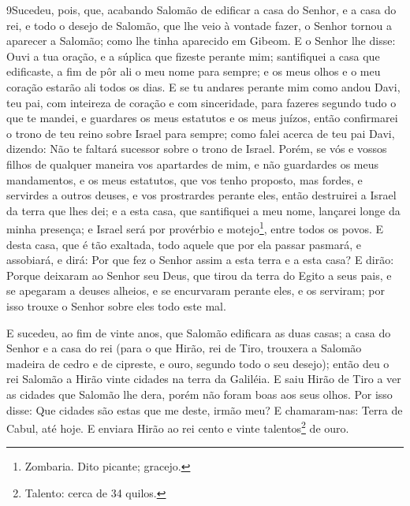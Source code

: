 \lettrine{9} Sucedeu, pois, que, acabando Salomão de edificar
a casa do Senhor, e a casa do rei, e todo o desejo de Salomão, que
lhe veio à vontade fazer, o Senhor tornou a aparecer a Salomão;
como lhe tinha aparecido em Gibeom. E o Senhor lhe disse: Ouvi a
tua oração, e a súplica que fizeste perante mim; santifiquei a casa
que edificaste, a fim de pôr ali o meu nome para sempre; e os meus
olhos e o meu coração estarão ali todos os dias. E se tu andares
perante mim como andou Davi, teu pai, com inteireza de coração e com
sinceridade, para fazeres segundo tudo o que te mandei, e guardares
os meus estatutos e os meus juízos, então confirmarei o trono de
teu reino sobre Israel para sempre; como falei acerca de teu pai
Davi, dizendo: Não te faltará sucessor sobre o trono de Israel.
Porém, se vós e vossos filhos de qualquer maneira vos apartardes
de mim, e não guardardes os meus mandamentos, e os meus estatutos,
que vos tenho proposto, mas fordes, e servirdes a outros deuses, e
vos prostrardes perante eles, então destruirei a Israel da terra
que lhes dei; e a esta casa, que santifiquei a meu nome, lançarei
longe da minha presença; e Israel será por provérbio e
motejo\footnote{Zombaria. Dito picante; gracejo.}, entre todos os
povos. E desta casa, que é tão exaltada, todo aquele que por ela
passar pasmará, e assobiará, e dirá: Por que fez o Senhor assim a
esta terra e a esta casa? E dirão: Porque deixaram ao Senhor seu
Deus, que tirou da terra do Egito a seus pais, e se apegaram a
deuses alheios, e se encurvaram perante eles, e os serviram; por
isso trouxe o Senhor sobre eles todo este mal.

E sucedeu, ao fim de vinte anos, que Salomão edificara as duas
casas; a casa do Senhor e a casa do rei (para o que Hirão,
rei de Tiro, trouxera a Salomão madeira de cedro e de cipreste, e
ouro, segundo todo o seu desejo); então deu o rei Salomão a Hirão
vinte cidades na terra da Galiléia. E saiu Hirão de Tiro a
ver as cidades que Salomão lhe dera, porém não foram boas aos seus
olhos. Por isso disse: Que cidades são estas que me deste,
irmão meu? E chamaram-nas: Terra de Cabul, até hoje. E
enviara Hirão ao rei cento e vinte talentos\footnote{Talento: cerca
de 34 quilos.} de ouro.

